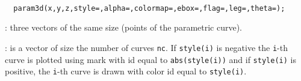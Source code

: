 \begin{mandesc}
  \\
\end{mandesc}
\begin{calling_sequence}
\begin{verbatim}
  param3d(x,y,z,style=,alpha=,colormap=,ebox=,flag=,leg=,theta=);
\end{verbatim}
\end{calling_sequence}

\begin{parameters}
  \begin{varlist}
    : three vectors of the same size (points of the parametric
    curve).

    : is a vector of size the number of curves \verb!nc!. If
    \verb!style(i)! is negative the \verb!i!-th curve is plotted using mark with id equal to \verb!abs(style(i))! and
    if \verb!style(i)! is positive, the \verb!i!-th curve is drawn with color id equal to \verb!style(i)!.


\end{varlist}
\end{parameters}
